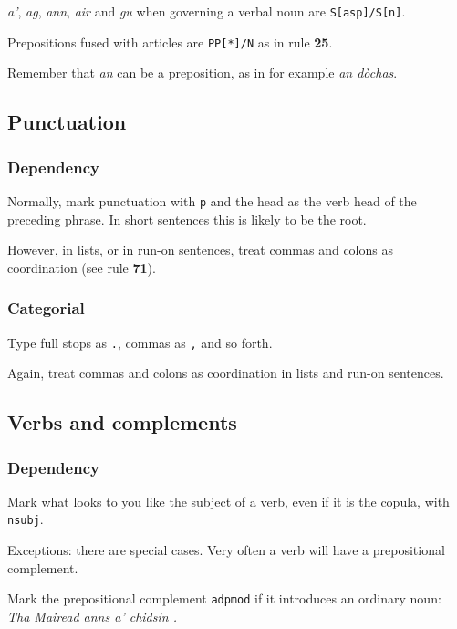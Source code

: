 \documentclass[a4paper]{article}
\begin{document}
 \textit{a'}, \textit{ag}, \textit{ann}, \textit{air} and \textit{gu} when governing a verbal noun are \texttt{S[asp]/S[n]}.

 Prepositions fused with articles are \texttt{PP[*]/N} as in rule {\bf 25}.

 Remember that \textit{an} can be a preposition, as in for example \textit{an d\`ochas}.



\subsection{Punctuation}
\subsubsection{Dependency}
 Normally, mark punctuation with \texttt{p} and the head as the verb head of the preceding phrase. In short sentences this is likely to be the root.

 However, in lists, or in run-on sentences, treat commas and colons as coordination (see rule \textbf{71}).

\subsubsection{Categorial}

 Type full stops as \texttt{.}, commas as \texttt{,} and so forth.

 Again, treat commas and colons as coordination in lists and run-on sentences.


\subsection{Verbs and complements}
\subsubsection{Dependency}
 Mark what looks to you like the subject of a verb, even if it is the copula, with \texttt{nsubj}.

Exceptions: there are special cases.
Very often a verb will have a prepositional complement.

 Mark the prepositional complement \texttt{adpmod} if it introduces an ordinary noun: \textit{Tha Mairead anns a' chidsin .}
\end{document}
